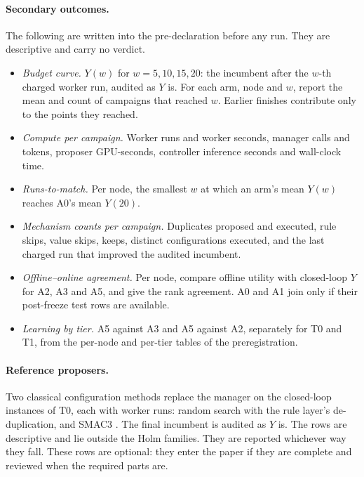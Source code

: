 \paragraph{Secondary outcomes.}
The following are written into the pre-declaration before any run. They are descriptive and carry no verdict.
\begin{itemize}
\item[(a)] \emph{Budget curve.} $Y(w)$ for $w=5,10,15,20$: the incumbent after the $w$-th charged worker run, audited as $Y$ is. For each arm, node and $w$, report the mean and count of campaigns that reached $w$. Earlier finishes contribute only to the points they reached.
\item[(b)] \emph{Compute per campaign.} Worker runs and worker seconds, manager calls and tokens, proposer GPU-seconds, controller inference seconds and wall-clock time.
\item[(c)] \emph{Runs-to-match.} Per node, the smallest $w$ at which an arm's mean $Y(w)$ reaches A0's mean $Y(20)$.
\item[(d)] \emph{Mechanism counts per campaign.} Duplicates proposed and executed, rule skips, value skips, keeps, distinct configurations executed, and the last charged run that improved the audited incumbent.
\item[(e)] \emph{Offline--online agreement.} Per node, compare offline utility with closed-loop $Y$ for A2, A3 and A5, and give the rank agreement. A0 and A1 join only if their post-freeze test rows are available.
\item[(f)] \emph{Learning by tier.} A5 against A3 and A5 against A2, separately for T0 and T1, from the per-node and per-tier tables of the preregistration.
\end{itemize}

\paragraph{Reference proposers.}
Two classical configuration methods replace the manager on the closed-loop instances of T0, each with \LoopW{} worker runs: random search with the rule layer's de-duplication, and SMAC3 \citep{lindauer2022smac}. The final incumbent is audited as $Y$ is. The rows are descriptive and lie outside the Holm families. They are reported whichever way they fall.  These rows are optional: they enter the paper if they are complete and reviewed when the required parts are.

